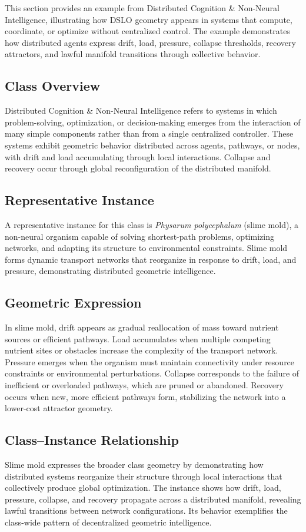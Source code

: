 This section provides an example from Distributed Cognition \& Non-Neural Intelligence, illustrating how 
DSLO geometry appears in systems that compute, coordinate, or optimize without centralized control. 
The example demonstrates how distributed agents express drift, load, pressure, collapse thresholds, 
recovery attractors, and lawful manifold transitions through collective behavior.

\subsection{Class Overview}
Distributed Cognition \& Non-Neural Intelligence refers to systems in which problem-solving, optimization, 
or decision-making emerges from the interaction of many simple components rather than from a single 
centralized controller. These systems exhibit geometric behavior distributed across agents, pathways, 
or nodes, with drift and load accumulating through local interactions. Collapse and recovery occur 
through global reconfiguration of the distributed manifold.

\subsection{Representative Instance}
A representative instance for this class is \emph{Physarum polycephalum} (slime mold), a non-neural 
organism capable of solving shortest-path problems, optimizing networks, and adapting its structure 
to environmental constraints. Slime mold forms dynamic transport networks that reorganize in response 
to drift, load, and pressure, demonstrating distributed geometric intelligence.

\subsection{Geometric Expression}
In slime mold, drift appears as gradual reallocation of mass toward nutrient sources or efficient 
pathways. Load accumulates when multiple competing nutrient sites or obstacles increase the complexity 
of the transport network. Pressure emerges when the organism must maintain connectivity under resource 
constraints or environmental perturbations. Collapse corresponds to the failure of inefficient or 
overloaded pathways, which are pruned or abandoned. Recovery occurs when new, more efficient pathways 
form, stabilizing the network into a lower-cost attractor geometry.

\subsection{Class--Instance Relationship}
Slime mold expresses the broader class geometry by demonstrating how distributed systems reorganize 
their structure through local interactions that collectively produce global optimization. The instance 
shows how drift, load, pressure, collapse, and recovery propagate across a distributed manifold, 
revealing lawful transitions between network configurations. Its behavior exemplifies the class-wide 
pattern of decentralized geometric intelligence.

